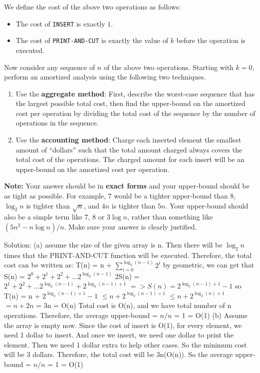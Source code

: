\documentclass{assignment-263}
\begin{document}
\begin{enumerate}
		We define the cost of the above two operations as follows:
		\begin{itemize}
			\item The cost of \texttt{INSERT} is exactly $1$.
			\item The cost of \texttt{PRINT-AND-CUT} is exactly the value of
				$k$ before the operation is executed.
		\end{itemize}

		Now consider any sequence of $n$ of the above two operations. Starting
		with $k=0$, perform an amortized analysis using the following two
		techniques.

		\begin{enumerate}
			\item Use the \textbf{aggregate method}: First, describe the
				worst-case sequence that has the largest possible total
				cost, then find the upper-bound on the amortized cost per
				operation by dividing the total cost of the sequence by the
				number of operations in the sequence.

			\item Use the \textbf{accounting method}: Charge each inserted
				element the smallest amount of ``dollars'' such that the
				total amount charged always covers the total cost of the
				operations. The charged amount for each insert will be an
				upper-bound on the amortized cost per operation.
		\end{enumerate}
		\textbf{Note:} Your answer should be in \textbf{exact forms} and
		your upper-bound should be as tight as possible. For example, $7$
		would be a tighter upper-bound than $8$, $\log_2 n$ is tighter than
		$\sqrt{n}$, and $4n$ is tighter than $5n$. Your upper-bound should
		also be a simple term like 7, 8 or $3\log n$, rather than something
		like $(5n^2 - n\log n) / n$. Make sure your answer is clearly
		justified. 

\end{enumerate}

\newpage
Solution: \vskip5pt
(a) assume the size of the given array is n. Then there will be $\log_2n$ times that the PRINT-AND-CUT function will be executed. Therefore, the total cost can be written as: T(n) = n + $\sum_{i=0}^{\log_2(n-1)} 2^i$\vskip5pt
by geometric, we can get that S(n) = $2^0 + 2^1 + 2^2 + ... 2^{\log_2(n-1)}$\vskip5pt
\qquad \qquad \qquad \qquad 2S(n) =  $2^1 + 2^2 + ... 2^{\log_2(n-1)} + 2^{\log_2(n-1)+1}$\vskip5pt
\qquad \qquad \qquad \qquad $=> S(n) = 2^{\log_2(n-1)+1} - 1$\vskip5pt
so T(n) = n + $2^{\log_2(n-1)+1} - 1$\vskip5pt
\qquad $\le n + 2^{\log_2(n-1)+1}$\vskip5pt
\qquad $\le n + 2^{\log_2(n)+1}$\vskip5pt
\qquad $= n + 2n$ = 3n = O(n)\vskip5pt
Total cost is O(n), and we have total number of n operations. Therefore, the average upper-bound = $n/n$ = 1 = O(1)\vskip5pt
(b) Assume the array is empty now. Since the cost of insert is O(1), for every element, we need 1 dollar to insert. And once we insert, we need one dollar to print the element. Then we need 1 dollar extra to help other cases. So the minimum cost will be 3 dollars. Therefore, the total cost will be 3n(O(n)). So the average upper-bound = $n/n$ = 1 = O(1)
\program
\end{document}
